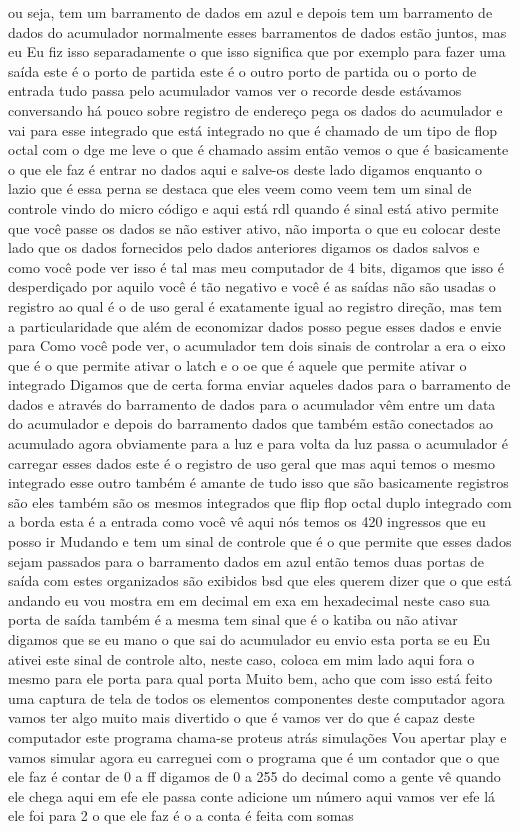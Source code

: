 \documentclass[oneside,11pt]{memoir} %
\begin{document}
ou seja, tem um  barramento de dados em azul e depois tem um  barramento de dados do acumulador normalmente  esses barramentos de dados estão juntos, mas eu  Eu fiz isso separadamente o que isso significa  que por exemplo para fazer uma saída  este é o porto de partida este é o  outro porto de partida ou o porto de  entrada tudo passa pelo acumulador  vamos ver o recorde desde  estávamos conversando há pouco sobre  registro de endereço  pega os dados do acumulador e vai para  esse integrado que está integrado no  que é chamado de um tipo de flop octal com  o dge me leve o que é chamado assim  então vemos o que é  basicamente o que ele faz é entrar no  dados aqui e salve-os deste  lado digamos enquanto o lazio que é  essa perna se destaca que eles veem como veem  tem um sinal de controle vindo do  micro código e aqui está rdl quando é  sinal está ativo permite que você passe os dados  se não estiver ativo, não importa o que eu  colocar deste lado que os dados fornecidos pelo  dados anteriores digamos os dados salvos  e como você pode ver isso é tal  mas meu computador de 4 bits, digamos  que isso é desperdiçado por aquilo  você é tão negativo e você é  as saídas não são usadas  o registro ao qual é o de uso geral  é exatamente igual ao registro  direção, mas tem a particularidade  que além de economizar dados posso  pegue esses dados e envie para  Como você pode ver, o acumulador tem dois sinais de  controlar a era o eixo que é o que  permite ativar o latch e o oe que é  aquele que permite ativar o integrado  Digamos que de certa forma enviar aqueles  dados para o barramento de dados e através do barramento  de dados para o acumulador vêm entre um data  do acumulador e depois do barramento  dados que também estão conectados ao  acumulado agora obviamente para a luz e para  volta da luz passa o acumulador é  carregar esses dados  este é o registro de uso geral que  mas aqui temos o mesmo integrado  esse outro também é amante de tudo isso  que são basicamente registros são  eles também são os mesmos integrados que  flip flop octal duplo integrado com  a borda  esta é a entrada como você vê aqui nós temos  os 420 ingressos que eu posso ir  Mudando  e tem um sinal de controle que é o  que permite que esses dados sejam passados para o barramento  dados em azul  então temos duas portas de saída  com estes organizados são exibidos bsd que  eles querem dizer que o que está andando eu vou  mostra em  em decimal em exa em hexadecimal neste  caso  sua porta de saída também é a mesma  tem sinal que é o katiba ou não  ativar digamos que se eu mano o que sai do  acumulador eu envio esta porta se eu  Eu ativei este sinal de controle  alto, neste caso, coloca em mim  lado aqui fora o mesmo para ele  porta para qual porta  Muito bem, acho que com isso está feito  uma captura de tela de todos os elementos  componentes deste computador  agora vamos ter algo muito mais divertido  o que é vamos ver do que é capaz  deste computador  este programa chama-se proteus atrás  simulações  Vou apertar play e vamos simular  agora eu carreguei com o programa que é  um contador que o que ele faz é contar  de 0 a ff digamos de 0 a 255 do  decimal  como a gente vê quando ele chega aqui em efe ele passa  conte adicione um número aqui vamos ver  efe lá ele foi para 2 o que ele faz é o  a conta é feita com somas 
\end{document}
